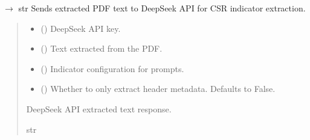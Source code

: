 \documentclass[letterpaper,10pt,english]{sphinxmanual}
\begin{document}

\begin{fulllineitems}
\label{\detokenize{autoapi/modules/input/emissions_parser/index:modules.input.emissions_parser.query_deepseek}}
\pysigstartsignatures
\pysiglinewithargsret
{}
{\sphinxparamcomma {}\sphinxparamcomma {}\sphinxparamcomma {}}
{{ $\rightarrow$ str}}
\pysigstopsignatures
\sphinxAtStartPar
Sends extracted PDF text to DeepSeek API for CSR indicator extraction.
\begin{quote}\begin{description}
\begin{itemize}
\item {} 
\sphinxAtStartPar
{} () \textendash{} DeepSeek API key.

\item {} 
\sphinxAtStartPar
{} () \textendash{} Text extracted from the PDF.

\item {} 
\sphinxAtStartPar
{} () \textendash{} Indicator configuration for prompts.

\item {} 
\sphinxAtStartPar
{} (\sphinxstyleliteralemphasis{\sphinxupquote{, }}) \textendash{} Whether to only extract header metadata. Defaults to False.

\end{itemize}

\sphinxAtStartPar
DeepSeek API extracted text response.

\sphinxAtStartPar
str

\end{description}\end{quote}

\end{fulllineitems}
\end{document}
